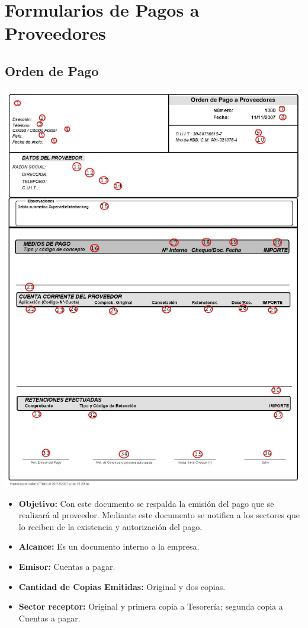 \pagebreak
\section{Formularios de Pagos a Proveedores}
\subsection{Orden de Pago} 

\begin{center}
 \includegraphics[scale=0.8,keepaspectratio=true]{./Circuitos-Teoricos/Pago-a-Proveedores/Images/orden-de-pago.png}
\end{center}

\pagebreak
\begin{itemize}
  \item \textbf{Objetivo:} Con este documento se respalda la emisión del pago que se realizará al proveedor.
Mediante este documento se notifica a los sectores que lo reciben de la existencia y autorización
del pago.
  \item \textbf{Alcance:} Es un documento interno a la empresa.
  \item \textbf{Emisor:} Cuentas a pagar.
  \item \textbf{Cantidad de Copias Emitidas:} Original y dos copias.
  \item \textbf{Sector receptor:} Original y primera copia a Tesorería; segunda copia a Cuentas a pagar.
\end{itemize}

